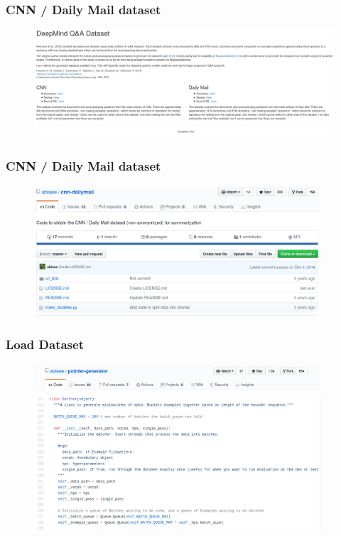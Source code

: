 \documentclass{tum-presentation}
\begin{document}
\begin{frame}
	\frametitle{CNN / Daily Mail dataset}
	\begin{figure}
	\centering
	\includegraphics[width=1\textwidth,keepaspectratio=true]{tum-resources/images/dataset_1.png}
	\label{fig:dataset_1}
	\end{figure}
\end{frame}

\begin{frame}
	\frametitle{CNN / Daily Mail dataset}
	\begin{figure}
		\centering
		\includegraphics[width=0.95\textwidth,keepaspectratio=true]{tum-resources/images/dataset_2.png}
		\label{fig:dataset_2}
	\end{figure}
\end{frame}

\begin{frame}
	\frametitle{Load Dataset}
	\begin{figure}
		\centering
		\includegraphics[width=0.95\textwidth,keepaspectratio=true]{tum-resources/images/dataset_3.png}
		\label{fig:dataset_3}
		\includegraphics[width=0.95\textwidth,keepaspectratio=true]{tum-resources/images/dataset_4.png}
		\label{fig:dataset_4}
	\end{figure}
\end{frame}
\end{document}
